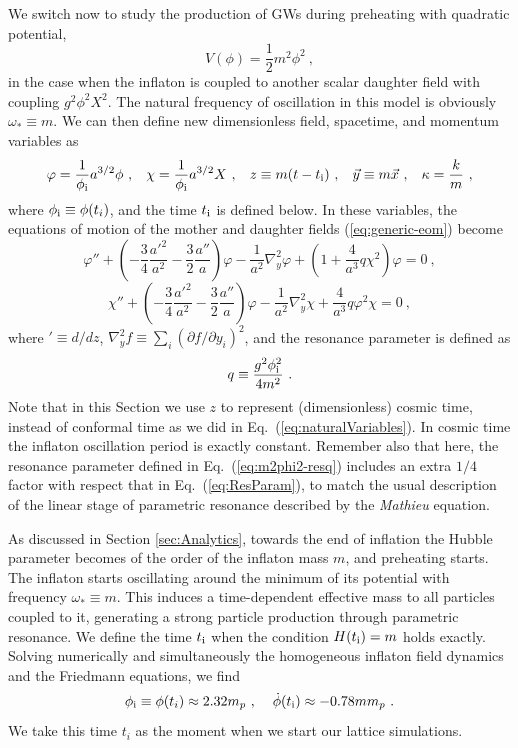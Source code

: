 \documentclass[a4paper,11pt]{article}
\newcommand{\be}{\begin{equation}}
\newcommand{\ee}{\end{equation}}
\begin{document}
We switch now to study the production of GWs during preheating with quadratic potential,
\be V(\phi) = \frac{1}{2} m^2 \phi^2 \ , \ee
in the case when the inflaton is coupled to another scalar daughter field with coupling $g^2 \phi^2 X^2$.
The natural frequency of oscillation in this model is obviously $\omega_* \equiv m$. We can then define new dimensionless field, spacetime, and momentum variables as
\be \varphi = \frac{1}{\phi_{\rm i}}a^{3/2} \phi \ , \hspace{0.3cm} \chi = \frac{1}{\phi_{\rm i}} a^{3/2} X \ , \hspace{0.3cm} z \equiv m (t - t_{\rm i}) \ , \hspace{0.3cm} \vec{y} \equiv m \vec{x} \ , \hspace{0.3cm}  \kappa = \frac{k}{m} \label{eq:m2phi2-newvariables} \ ,\ee
where $\phi_{\rm i } \equiv \phi (t_i)$, and the time $t_{\rm i}$ is defined below. In these variables, the equations of motion of the mother and daughter fields (\ref{eq:generic-eom}) become
\be \varphi '' + \left( - \frac{3}{4} \frac{a'^2}{a^2} - \frac{3}{2} \frac{a''}{a} \right) \varphi - \frac{1}{a^2} \nabla_y^2 \varphi + \left( 1 +  \frac{4}{a^{3}} q \chi^2 \right)  \varphi  = 0 \ , \label{eq:m2phi2-eom1}\ee
\be \chi'' + \left( - \frac{3}{4} \frac{a'^2}{a^2} - \frac{3}{2} \frac{a''}{a} \right) \varphi - \frac{1}{a^2} \nabla_y^2 \chi + \frac{4}{a^3} q \varphi^2 \chi = 0 \ , \label{eq:m2phi2-eom2}\ee
where $' \equiv d / dz$, $\nabla_y^2 f \equiv \sum_i (\partial f / \partial y_i)^2$, and the resonance parameter is defined as 
\be q \equiv \frac{g^2 \phi_{\rm i}^2}{4 m^2} \label{eq:m2phi2-resq}\ . \ee
Note that in this Section we use $z$ to represent (dimensionless) cosmic time, instead of conformal time as we did in Eq.~(\ref{eq:naturalVariables}). In cosmic time the inflaton oscillation period is exactly constant. Remember also that here, the resonance parameter defined in Eq.~(\ref{eq:m2phi2-resq}) includes an extra $1/4$ factor with respect that in Eq.~(\ref{eq:ResParam}), to match the usual description of the linear stage of parametric resonance described by the {\it Mathieu} equation.

As discussed in Section \ref{sec:Analytics}, towards the end of inflation the Hubble parameter becomes of the order of the inflaton mass $m$, and preheating starts. The inflaton starts oscillating around the minimum of its potential with frequency $\omega_* \equiv m$. This induces a time-dependent effective mass to all particles coupled to it, generating a strong particle production through parametric resonance. We define the time $t_{\rm i}$ when the condition $H (t_{\rm i}) = m$ holds exactly. Solving numerically and simultaneously the homogeneous inflaton field dynamics and the Friedmann equations, we find
\be \phi_{\rm i} \equiv \phi (t_i) \approx 2.32 m_p \ , \hspace{0.4cm} \dot{\phi} (t_{\rm i}) \approx -0.78 m m_p \ .\ee
We take this time $t_i$ as the moment when we start our lattice simulations.
\end{document}
